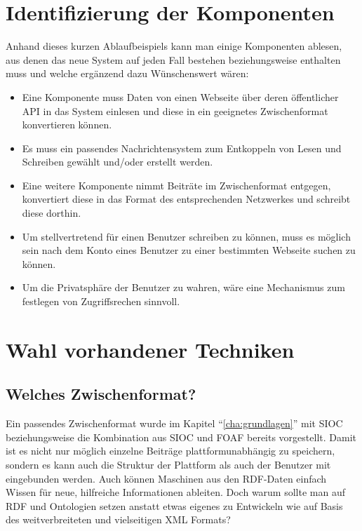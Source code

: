 \section{Identifizierung der Komponenten} %
\label{sec:identifizierung_der_komponenten}

Anhand dieses kurzen Ablaufbeispiels kann man einige Komponenten ablesen, aus denen das neue System auf jeden Fall bestehen beziehungsweise enthalten muss und welche ergänzend dazu Wünschenswert wären:

\begin{itemize} 
    \item Eine Komponente muss Daten von einen Webseite über deren öffentlicher API in das System einlesen und diese in ein geeignetes Zwischenformat konvertieren können.
    \item Es muss ein passendes Nachrichtensystem zum Entkoppeln von Lesen und Schreiben gewählt und/oder erstellt werden.
    \item Eine weitere Komponente nimmt Beiträte im Zwischenformat entgegen, konvertiert diese in das Format des entsprechenden Netzwerkes und schreibt diese dorthin.
    \item Um stellvertretend für einen Benutzer schreiben zu können, muss es möglich sein nach dem Konto eines Benutzer zu einer bestimmten Webseite suchen zu können.
    \item Um die Privatsphäre der Benutzer zu wahren, wäre eine Mechanismus zum festlegen von Zugriffsrechen sinnvoll.
\end{itemize}   


\section{Wahl vorhandener Techniken} %
\label{sec:wahl_vorhandener_techniken}


\subsection{Welches Zwischenformat?} %
\label{sub:welches_zwischenformat}

Ein passendes Zwischenformat wurde im Kapitel \enquote{\ref{cha:grundlagen}} mit SIOC beziehungsweise die Kombination aus SIOC und FOAF bereits vorgestellt. Damit ist es nicht nur möglich einzelne Beiträge plattformunabhängig zu speichern, sondern es kann auch die Struktur der Plattform als auch der Benutzer mit eingebunden werden. Auch können Maschinen aus den RDF-Daten einfach Wissen für neue, hilfreiche Informationen ableiten. Doch warum sollte man auf RDF und Ontologien setzen anstatt etwas eigenes zu Entwickeln wie auf Basis des weitverbreiteten und vielseitigen XML Formats?

